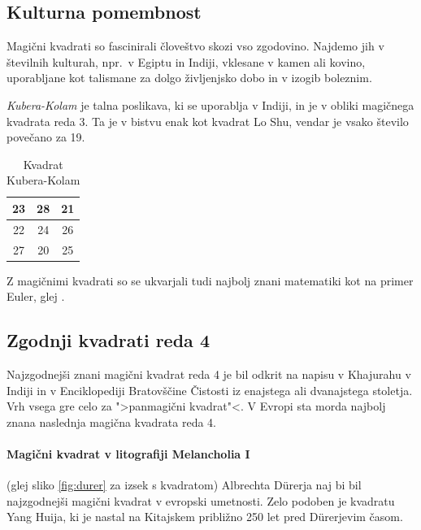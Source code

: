 \documentclass[a4paper,12pt]{article}
\newenvironment{magic}[3]{\begin{table}[!ht]
   \centering
   \caption{#1}
   \label{#2}
   \large
   \begin{tabular}{|*{#3}{c|}}
   \hline}{ \end{tabular}
   \normalsize
\end{table}}
\theoremstyle{definition}
\theoremstyle{plain}
\begin{document}
\subsection{Kulturna pomembnost}

Magični kvadrati so fascinirali človeštvo skozi vso zgodovino. Najdemo jih
v številnih kulturah, npr.\ v Egiptu in Indiji, vklesane v kamen ali
kovino, uporabljane kot talismane za dolgo življenjsko dobo in v
izogib boleznim.

\emph{Kubera-Kolam} je talna poslikava, ki se uporablja v Indiji, in je v
obliki magičnega kvadrata reda 3. Ta je v bistvu enak kot kvadrat
Lo Shu, vendar je vsako število povečano za 19.

\begin{magic}{Kvadrat Kubera-Kolam}{table:kubera}{3}
   23 & 28 & 21 \\\hline
   22 & 24 & 26 \\\hline
   27 & 20 & 25 \\\hline
\end{magic}

Z magičnimi kvadrati so se ukvarjali tudi najbolj znani matematiki kot na
primer Euler, glej \cite{euler}.


\subsection{Zgodnji kvadrati reda 4}

Najzgodnejši znani magični kvadrat reda 4 je bil odkrit na napisu
v Khajurahu v Indiji in v Enciklopediji Bratovščine Čistosti iz enajstega
ali dvanajstega stoletja. Vrh vsega gre celo za ">panmagični kvadrat"<.
V Evropi sta morda najbolj znana naslednja magična kvadrata reda 4.

\paragraph{Magični kvadrat v litografiji Melancholia I}
(glej sliko \ref{fig:durer}
za izsek s kvadratom) Albrechta Dürerja naj bi bil najzgodnejši magični kvadrat
v evropski umetnosti. Zelo podoben je kvadratu Yang Huija, ki je nastal na Kitajskem
približno 250 let pred Dürerjevim časom. %

\end{document}
